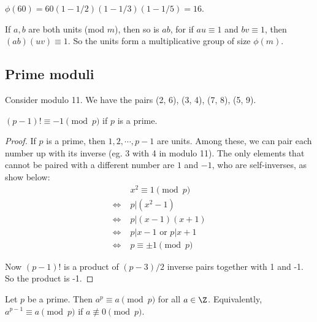 \documentclass[a4paper]{article}
\begin{document}
  \begin{eg}
    $\phi(60) = 60(1 - 1/2)(1 - 1/3)(1 - 1/5) = 16$.
  \end{eg}

  \begin{note}
    If $a, b$ are both units (mod $m$), then so is $ab$, for if $au \equiv 1$ and $bv \equiv 1$, then $(ab)(uv)\equiv 1$. So the units form a multiplicative group of size $\phi(m)$.
  \end{note}

  \subsection{Prime moduli}
  \begin{eg}
    Consider modulo 11. We have the pairs (2, 6), (3, 4), (7, 8), (5, 9).
  \end{eg}

  \begin{thm}
    $(p - 1)! \equiv -1\pmod p$ if $p$ is a prime.
  \end{thm}

  \begin{proof}
    If $p$ is a prime, then $1, 2, \cdots, p - 1$ are units. Among these, we can pair each number up with its inverse (eg. 3 with 4 in modulo 11). The only elements that cannot be paired with a different number are $1$ and $-1$, who are self-inverses, as show below:
    \begin{align*}
      &\;x^2 \equiv 1\pmod p\\
      \Leftrightarrow&\; p | (x^2 - 1)\\
      \Leftrightarrow&\; p | (x - 1)(x + 1)\\
      \Leftrightarrow&\; p | x - 1 \text{ or } p | x + 1\\
      \Leftrightarrow&\; p \equiv \pm 1\pmod p
    \end{align*}

    Now $(p - 1)!$ is a product of $(p - 3)/2$ inverse pairs together with 1 and -1. So the product is -1.
  \end{proof}

  \begin{thm}
    Let $p$ be a prime. Then $a^p \equiv a\pmod p$ for all $a\in \Z$. Equivalently, $a^{p - 1}\equiv a\pmod p$ if $a\not\equiv 0 \pmod p$.
  \end{thm}
\end{document}
